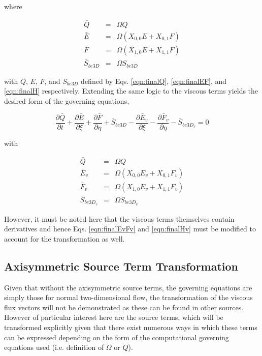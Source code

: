 	where

\begin{equation}
	\begin{array}{ccc}
		\bar{Q} &=& \Omega Q \\
		\bar{E} &=& \Omega (X_{0,0}E + X_{0,1}F) \\
		\bar{F} &=& \Omega (X_{1,0}E + X_{1,1}F) \\
		\bar{S}_{be3D} &=& \Omega S_{be3D}
	\end{array}
\label{eqn:eulerbars}
\end{equation}

	with $Q$, $E$, $F$, and $S_{be3D}$ defined by Eqs. \ref{eqn:finalQ}, \ref{eqn:finalEF}, and \ref{eqn:finalH} 
respectively.  Extending the same logic to the viscous terms yields the desired form of the governing equations,

\begin{equation}
	\frac{\partial \bar{Q}}{\partial t} + \frac{\partial \bar{E}}{\partial \xi} 
	+ \frac{\partial \bar{F}}{\partial \eta} + \bar{S}_{be3D} -\frac{\partial \bar{E}_v}{\partial \xi} 
	- \frac{\partial \bar{F}_v}{\partial \eta} - \bar{S}_{be3D_v} = 0	
\label{eqn:finalbar}
\end{equation}

	with

\begin{equation}
	\begin{array}{ccc}
		\bar{Q} &=& \Omega Q \\
		\bar{E}_v &=& \Omega (X_{0,0}E_v + X_{0,1}F_v) \\
		\bar{F}_v &=& \Omega (X_{1,0}E_v + X_{1,1}F_v) \\
		\bar{S}_{be3D_v} &=& \Omega S_{be3D_v}
	\end{array}
\label{eqn:viscousbars}
\end{equation}

	However, it must be noted here that the viscous terms themselves contain derivatives and hence
Eqs. \ref{eqn:finalEvFv} and \ref{eqn:finalHv} must be modified to account for the transformation
as well.

\subsection{Axisymmetric Source Term Transformation}

	Given that without the axisymmetric source terms, the governing equations are simply those for
normal two-dimensional flow, the transformation of the viscous flux vectors will not be demonstrated as these can
be found in other sources.  However of particular interest here are the source terms, which will be transformed
explicitly given that there exist numerous ways in which these terms can be expressed depending on the 
form of the computational governing equations used (i.e. definition of $\Omega$ or  $Q$).

